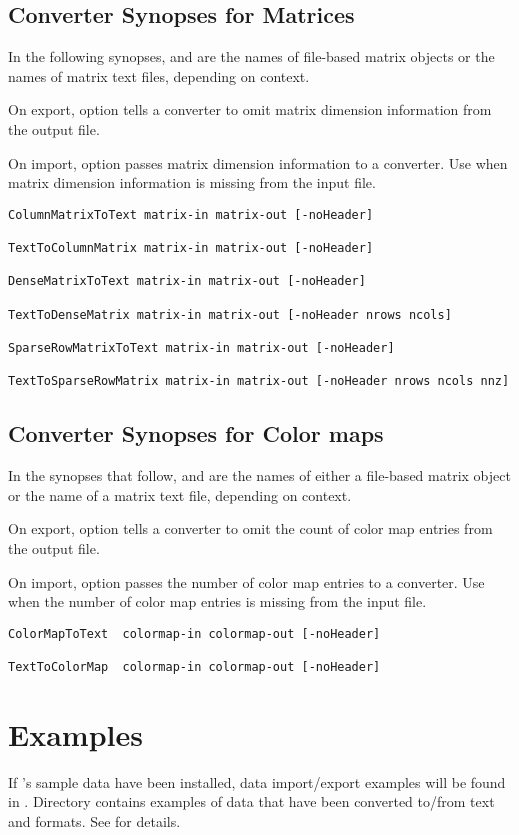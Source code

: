 \subsection{Converter Synopses for Matrices}

In the following synopses,  and 
are the names of \sr{} file-based matrix objects or the names
of matrix text files, depending on context.

On export, option  tells a converter to omit matrix
dimension information from the output file.

On import, option  passes matrix dimension
information to a converter.  Use  when matrix
dimension information is missing from the input file.

\begin{verbatim}
ColumnMatrixToText matrix-in matrix-out [-noHeader]

TextToColumnMatrix matrix-in matrix-out [-noHeader]

DenseMatrixToText matrix-in matrix-out [-noHeader]

TextToDenseMatrix matrix-in matrix-out [-noHeader nrows ncols]

SparseRowMatrixToText matrix-in matrix-out [-noHeader]

TextToSparseRowMatrix matrix-in matrix-out [-noHeader nrows ncols nnz]
\end{verbatim}

\subsection{Converter Synopses for Color maps}

In the synopses that follow,  and
 are the names of either a \sr{} file-based
matrix object or the name of a matrix text file, depending on context.

On export, option  tells a converter to omit the
count of color map entries from the output file.

On import, option  passes the number of color map
entries to a converter.  Use  when the number of
color map entries is missing from the input file.

\begin{verbatim}
ColorMapToText  colormap-in colormap-out [-noHeader]

TextToColorMap  colormap-in colormap-out [-noHeader]
\end{verbatim}

\section{Examples}
\label{sec:converter_ex}

If \sr{}'s sample data have been installed, data import/export
examples will be found in .
Directory  contains examples of
data that have been converted to/from text and \sr{} formats.  See
 for details.

